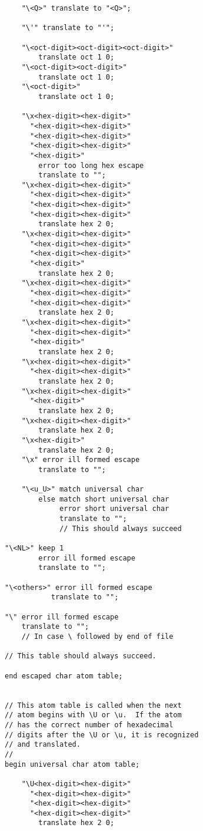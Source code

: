 \documentclass[12pt]{article}
\newenvironment{indpar}[1][0.3in]%
	{\begin{list}{}%
		     {\setlength{\itemsep}{0in}%
		      \setlength{\topsep}{0in}%
		      \setlength{\parsep}{1ex}%
		      \setlength{\labelwidth}{#1}%
		      \setlength{\leftmargin}{#1}%
		      \addtolength{\leftmargin}{\labelsep}}%
	 \item}%
	{\end{list}}
\begin{document}
\begin{indpar}
\begin{verbatim}
    "\<Q>" translate to "<Q>";

    "\'" translate to "'";

    "\<oct-digit><oct-digit><oct-digit>"
        translate oct 1 0;
    "\<oct-digit><oct-digit>"
        translate oct 1 0;
    "\<oct-digit>"
        translate oct 1 0;

    "\x<hex-digit><hex-digit>"
      "<hex-digit><hex-digit>"
      "<hex-digit><hex-digit>"
      "<hex-digit><hex-digit>"
      "<hex-digit>"
        error too long hex escape
        translate to "";
    "\x<hex-digit><hex-digit>"
      "<hex-digit><hex-digit>"
      "<hex-digit><hex-digit>"
      "<hex-digit><hex-digit>"
        translate hex 2 0;
    "\x<hex-digit><hex-digit>"
      "<hex-digit><hex-digit>"
      "<hex-digit><hex-digit>"
      "<hex-digit>"
        translate hex 2 0;
    "\x<hex-digit><hex-digit>"
      "<hex-digit><hex-digit>"
      "<hex-digit><hex-digit>"
        translate hex 2 0;
    "\x<hex-digit><hex-digit>"
      "<hex-digit><hex-digit>"
      "<hex-digit>"
        translate hex 2 0;
    "\x<hex-digit><hex-digit>"
      "<hex-digit><hex-digit>"
        translate hex 2 0;
    "\x<hex-digit><hex-digit>"
      "<hex-digit>"
        translate hex 2 0;
    "\x<hex-digit><hex-digit>"
        translate hex 2 0;
    "\x<hex-digit>"
        translate hex 2 0;
    "\x" error ill formed escape
        translate to "";

    "\<u_U>" match universal char
        else match short universal char
             error short universal char
             translate to "";
             // This should always succeed

"\<NL>" keep 1
        error ill formed escape
        translate to "";

"\<others>" error ill formed escape
           translate to "";

"\" error ill formed escape
    translate to "";
    // In case \ followed by end of file

// This table should always succeed.

end escaped char atom table;


// This atom table is called when the next
// atom begins with \U or \u.  If the atom
// has the correct number of hexadecimal
// digits after the \U or \u, it is recognized
// and translated.
//
begin universal char atom table;

    "\U<hex-digit><hex-digit>"
      "<hex-digit><hex-digit>"
      "<hex-digit><hex-digit>"
      "<hex-digit><hex-digit>"
        translate hex 2 0;


\end{verbatim}
\end{indpar}
\end{document}
